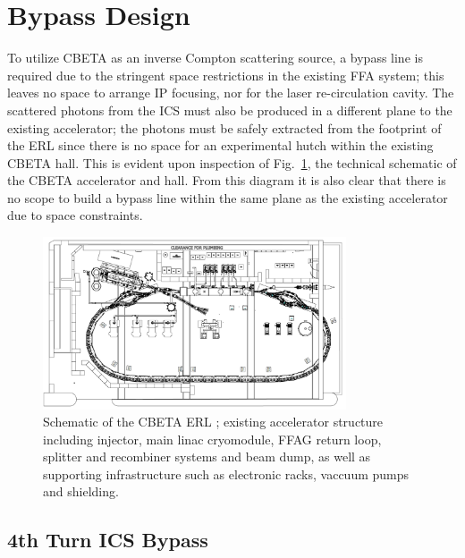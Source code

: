 \documentclass[../main.tex]{subfiles}
\begin{document}
\section{Bypass Design}
\label{sec:bypass_design}

To utilize CBETA as an inverse Compton scattering source, a bypass line is required due to the stringent space restrictions in the existing FFA system; this leaves no space to arrange IP focusing, nor for the laser re-circulation cavity. The scattered photons from the ICS must also be produced in a different plane to the existing accelerator; the photons must be safely extracted from the footprint of the ERL since there is no space for an experimental hutch within the existing CBETA hall. This is evident upon inspection of Fig.~\ref{fig:CBETA_schematic}, the technical schematic of the CBETA accelerator and hall. From this diagram it is also clear that there is no scope to build a bypass line within the same plane as the existing accelerator due to space constraints.
\begin{figure}[!h]
\centering
\includegraphics[width=0.8\textwidth]{Figures/CBETA_Inverse_Compton_Source_Design/CBETA_schematic.pdf}
\caption{Schematic of the CBETA ERL \cite{hoffstaetter2017cbeta}; existing accelerator structure including injector, main linac cryomodule, FFAG return loop, splitter and recombiner systems and beam dump, as well as supporting infrastructure such as electronic racks, vaccuum pumps and shielding.}
\label{fig:CBETA_schematic}
\end{figure}

\subsection{4th Turn ICS Bypass}
\end{document}
